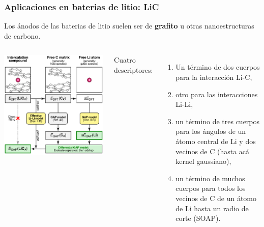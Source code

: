 \documentclass[aspectratio=169]{beamer}
\let\oldtextbf\textbf
\renewcommand{\textbf}[1]{\textcolor{nordblue}{\oldtextbf{#1}}}
\begin{document}
    \begin{frame}
        \frametitle{Aplicaciones en baterias de litio: LiC}
            
        Los ánodos de las baterias de litio suelen ser de \textbf{grafito} u otras
        nanoestructuras de carbono.
        
        \begin{columns}
            \begin{center}
                \includegraphics[width=\columnwidth]{LiC-metodo.png}
            \end{center}

            Cuatro descriptores:
            \begin{enumerate}
                \item Un término de dos cuerpos para la interacción Li-C, 
                \item otro para las interacciones Li-Li,
                \item un término de tres cuerpos para los ángulos de un átomo 
                    central de Li y dos vecinos de C (hasta acá kernel gaussiano),
                \item un término de muchos cuerpos para todos los vecinos de C
                    de un átomo de Li hasta un radio de corte (SOAP).
            \end{enumerate}
        \end{columns}

    \end{frame}
    
\end{document}

